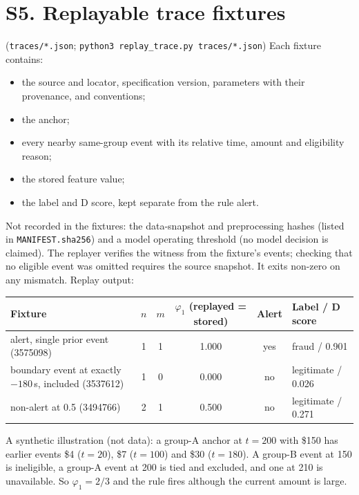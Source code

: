 \documentclass[10pt]{article}
\newcommand{\tf}[1]{\texttt{#1}}
\begin{document}
\section*{S5. Replayable trace fixtures} (\tf{traces/*.json}; \tf{python3 replay\_trace.py traces/*.json})
Each fixture contains:
\begin{itemize}\itemsep0pt
\item the source and locator, specification version, parameters with their provenance, and conventions;
\item the anchor;
\item every nearby same-group event with its relative time, amount and eligibility reason;
\item the stored feature value;
\item the label and D score, kept separate from the rule alert.
\end{itemize}
Not recorded in the fixtures: the data-snapshot and preprocessing hashes (listed in \tf{MANIFEST.sha256}) and a model operating threshold (no model decision is claimed). The replayer verifies the witness from the fixture's events; checking that no eligible event was omitted requires the source snapshot. It exits non-zero on any mismatch. Replay output:
\begin{center}\footnotesize
\begin{tabular}{@{}lccccl@{}}
\toprule
Fixture & $n$ & $m$ & $\varphi_1$ (replayed = stored) & Alert & Label / D score \\
\midrule
alert, single prior event (3575098) & 1 & 1 & 1.000 & yes & fraud / 0.901 \\
boundary event at exactly $-180$\,s, included (3537612) & 1 & 0 & 0.000 & no & legitimate / 0.026 \\
non-alert at 0.5 (3494766) & 2 & 1 & 0.500 & no & legitimate / 0.271 \\
\bottomrule
\end{tabular}\end{center}
A synthetic illustration (not data): a group-A anchor at $t=200$ with \$150 has earlier events \$4 ($t=20$), \$7 ($t=100$) and \$30 ($t=180$). A group-B event at 150 is ineligible, a group-A event at 200 is tied and excluded, and one at 210 is unavailable. So $\varphi_1=2/3$ and the rule fires although the current amount is large.
\end{document}

